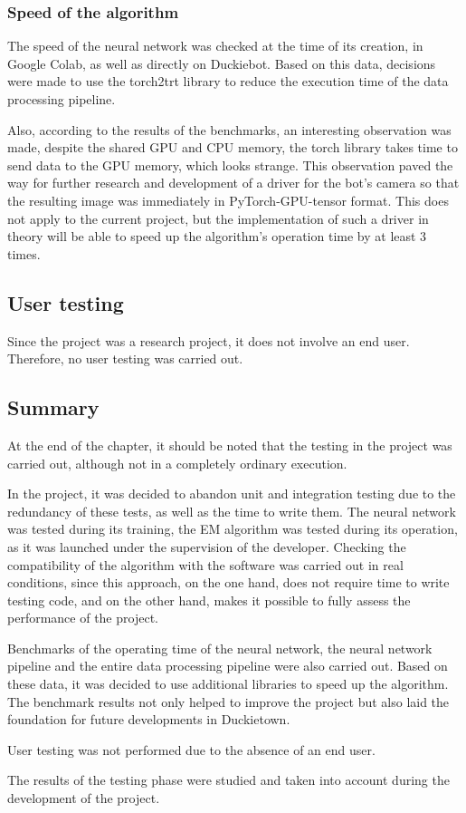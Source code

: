 \subsubsection{Speed of the algorithm}

The speed of the neural network was checked at the time of its creation, in Google Colab, as well as directly on Duckiebot. Based on this data, decisions were made
to use the torch2trt library to reduce the execution time of the data processing pipeline.

Also, according to the results of the benchmarks, an interesting observation was made, despite the shared GPU and CPU memory, the torch library takes time to send data
to the GPU memory, which looks strange. This observation paved the way for further research and development of a driver for the bot's camera so that the resulting 
image was immediately in PyTorch-GPU-tensor format. This does not apply to the current project, but the implementation of such a driver in theory will be able 
to speed up the algorithm's operation time by at least 3 times.

\subsection{User testing}
Since the project was a research project, it does not involve an end user. Therefore, no user testing was carried out.

\subsection{Summary}

\noindent At the end of the chapter, it should be noted that the testing in the project was carried out, although not in a completely ordinary execution.

\noindent  In the project, it was decided to abandon unit and integration testing due to the redundancy of these tests, as well as the time to write them. 
The neural network was tested during its training, the EM algorithm was tested during its operation, as it was launched under the supervision of the developer.
Checking the compatibility of the algorithm with the software was carried out in real conditions, since this approach, on the one hand, does not require time to write
testing code, and on the other hand, makes it possible to fully assess the performance of the project.

\noindent Benchmarks of the operating time of the neural network, the neural network pipeline and the entire data processing pipeline were also carried out. 
Based on these data, it was decided to use additional libraries to speed up the algorithm. The benchmark results not only helped to improve the project but also 
laid the foundation for future developments in Duckietown.

\noindent User testing was not performed due to the absence of an end user.

\noindent The results of the testing phase were studied and taken into account during the development of the project.